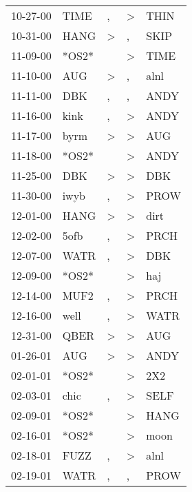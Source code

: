 \begin{supertabular}{lllll}
 10-27-00 &   TIME &                , &     \textgreater &   THIN \\
 10-31-00 &   HANG &     \textgreater &                , &   SKIP \\
 11-09-00 &  *OS2* &                  &     \textgreater &   TIME \\
 11-10-00 &    AUG &     \textgreater &                , &   alnl \\
 11-11-00 &    DBK &                , &                , &   ANDY \\
 11-16-00 &   kink &                , &     \textgreater &   ANDY \\
 11-17-00 &   byrm &     \textgreater &     \textgreater &    AUG \\
 11-18-00 &  *OS2* &                  &     \textgreater &   ANDY \\
 11-25-00 &    DBK &     \textgreater &     \textgreater &    DBK \\
 11-30-00 &   iwyb &                , &     \textgreater &   PROW \\
 12-01-00 &   HANG &     \textgreater &     \textgreater &   dirt \\
 12-02-00 &   5ofb &                , &     \textgreater &   PRCH \\
 12-07-00 &   WATR &                , &     \textgreater &    DBK \\
 12-09-00 &  *OS2* &                  &     \textgreater &    haj \\
 12-14-00 &   MUF2 &                , &     \textgreater &   PRCH \\
 12-16-00 &   well &                , &     \textgreater &   WATR \\
 12-31-00 &   QBER &     \textgreater &     \textgreater &    AUG \\
 01-26-01 &    AUG &     \textgreater &     \textgreater &   ANDY \\
 02-01-01 &  *OS2* &                  &     \textgreater &    2X2 \\
 02-03-01 &   chic &                , &     \textgreater &   SELF \\
 02-09-01 &  *OS2* &                  &     \textgreater &   HANG \\
 02-16-01 &  *OS2* &                  &     \textgreater &   moon \\
 02-18-01 &   FUZZ &                , &     \textgreater &   alnl \\
 02-19-01 &   WATR &                , &                , &   PROW \\

\end{supertabular}

